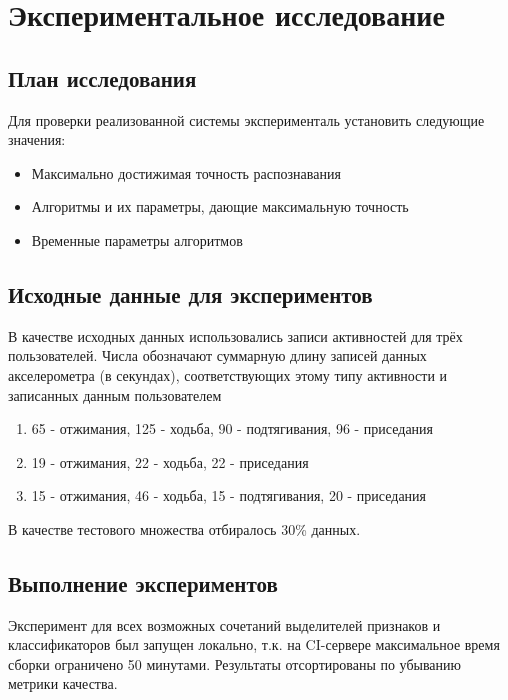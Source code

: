 
\chapter{Экспериментальное исследование}

\section{План исследования}

Для проверки реализованной системы эксперименталь установить следующие значения:

\begin{itemize}
\item Максимально достижимая точность распознавания
\item Алгоритмы и их параметры, дающие максимальную точность
\item Временные параметры алгоритмов
\end{itemize}


\section{Исходные данные для экспериментов}

В качестве исходных данных использовались записи активностей для трёх пользователей. Числа обозначают суммарную длину записей данных акселерометра (в секундах), соответствующих этому типу активности и записанных данным пользователем

\begin{enumerate}
\item 65 - отжимания, 125 - ходьба, 90 - подтягивания, 96 - приседания %
\item 19 - отжимания, 22 - ходьба, 22 - приседания %
\item 15 - отжимания, 46 - ходьба, 15 - подтягивания, 20 - приседания %
\end{enumerate}

В качестве тестового множества отбиралось 30\% данных.


\section{Выполнение экспериментов}

Эксперимент для всех возможных сочетаний выделителей признаков и классификаторов был запущен локально, т.к. на CI-сервере максимальное время сборки ограничено 50 минутами. Результаты отсортированы по убыванию метрики качества.


